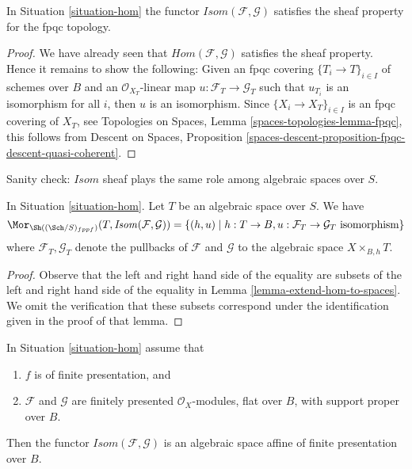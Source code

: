 \begin{lemma}
\label{lemma-isom-sheaf}
In Situation \ref{situation-hom} the functor
$\mathit{Isom}(\mathcal{F}, \mathcal{G})$ 
satisfies the sheaf property for the fpqc topology.
\end{lemma}

\begin{proof}
We have already seen that $\mathit{Hom}(\mathcal{F}, \mathcal{G})$
satisfies the sheaf property. Hence it remains to show the following:
Given an fpqc covering $\{T_i \to T\}_{i \in I}$ of schemes over $B$
and an $\mathcal{O}_{X_T}$-linear map
$u : \mathcal{F}_T \to \mathcal{G}_T$ such that
$u_{T_i}$ is an isomorphism for all $i$, then $u$ is an isomorphism.
Since $\{X_i \to X_T\}_{i \in I}$ is an fpqc covering of $X_T$, see
Topologies on Spaces, Lemma \ref{spaces-topologies-lemma-fpqc},
this follows from
Descent on Spaces, Proposition
\ref{spaces-descent-proposition-fpqc-descent-quasi-coherent}.
\end{proof}

\noindent
Sanity check: $\mathit{Isom}$ sheaf plays the same role among algebraic spaces
over $S$.

\begin{lemma}
\label{lemma-extend-isom-to-spaces}
In Situation \ref{situation-hom}. Let $T$ be an algebraic space over $S$.
We have
$$
\Mor_{\Sh((\Sch/S)_{fppf})}(T, \mathit{Isom}(\mathcal{F}, \mathcal{G})) =
\{(h, u) \mid
h : T \to B, u : \mathcal{F}_T \to \mathcal{G}_T\text{ isomorphism}\}
$$
where $\mathcal{F}_T, \mathcal{G}_T$ denote the pullbacks of $\mathcal{F}$
and $\mathcal{G}$ to the algebraic space $X \times_{B, h} T$.
\end{lemma}

\begin{proof}
Observe that the left and right hand side of the equality are
subsets of the left and right hand side of the equality in
Lemma \ref{lemma-extend-hom-to-spaces}.
We omit the verification that these subsets correspond under
the identification given in the proof of that lemma.
\end{proof}

\begin{proposition}
\label{proposition-isom}
In Situation \ref{situation-hom} assume that
\begin{enumerate}
\item $f$ is of finite presentation, and
\item $\mathcal{F}$ and $\mathcal{G}$ are finitely presented
$\mathcal{O}_X$-modules, flat over $B$, with support proper over $B$.
\end{enumerate}
Then the functor $\mathit{Isom}(\mathcal{F}, \mathcal{G})$ is
an algebraic space affine of finite presentation over $B$.
\end{proposition}

